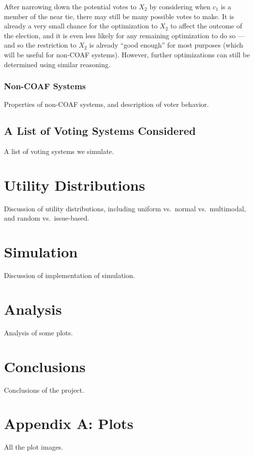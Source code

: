 \documentclass[11pt]{article}
\begin{document}
    After narrowing down the potential votes to $X_2$ by considering when $c_1$ is a member of the near tie,
    there may still be many possible votes to make.
    It is already a very small chance for the optimization to $X_2$ to affect the outcome of the election,
    and it is even less likely for any remaining optimization to do so
    --- and so the restriction to $X_2$ is already ``good enough'' for most purposes
    (which will be useful for non-COAF systems).
    However, further optimizations can still be determined using similar reasoning.


    \subsubsection{Non-COAF Systems}

    Properties of non-COAF systems, and description of voter behavior.

    \subsection{A List of Voting Systems Considered}\label{subsec:a-list-of-voting-systems-considered}

    A list of voting systems we simulate.


    \section{Utility Distributions}\label{sec:utility-distributions}

    Discussion of utility distributions, including uniform vs.\ normal
    vs.\ multimodal, and random vs.\ issue-based.


    \section{Simulation}\label{sec:simulation}

    Discussion of implementation of simulation.


    \section{Analysis}\label{sec:analysis}

    Analysis of some plots.


    \section{Conclusions}\label{sec:conclusions}

    Conclusions of the project.


    \section{Appendix A: Plots}\label{sec:appendix-a:-plots}

    All the plot images.


    
    {}
\end{document}
